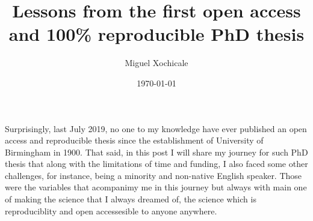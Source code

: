 \documentclass[11pt]{article}
\title{
Lessons from the first open access and 100\% reproducible 
PhD thesis}
\author{Miguel Xochicale}
\date{\today}
\begin{document}
\maketitle

Surprisingly, %
last July 2019, no one to my knowledge have ever published 
an open access and reproducible thesis 
since the establishment of University of Birmingham in 1900. 
That said, in this post I will share my journey for such PhD thesis
that along with the limitations of time and funding, 
I also faced some other challenges, for instance, %
being a minority and non-native English speaker.  
Those were the variables that acompanimy me in this journey 
but always with main one of making the science that 
I always dreamed of, the science which is 
reproduciblity and open accessesible to anyone anywhere.




\end{document}
